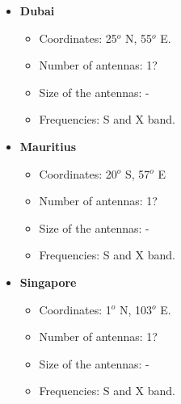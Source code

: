 \begin{itemize}
\begin{itemize}
\end{itemize}
\item \textbf{Dubai}
\begin{itemize}
\item Coordinates: 25$^{o}$ N, 55$^{o}$ E.
\item Number of antennas: 1?
\item Size of the antennas: -
\item Frequencies: S and X band.
\end{itemize}
\item \textbf{Mauritius}
\begin{itemize}
\item Coordinates: 20$^{o}$ S, 57$^{o}$ E
\item Number of antennas: 1?
\item Size of the antennas: -
\item Frequencies: S and X band.
\end{itemize}
\item \textbf{Singapore}
\begin{itemize}
\item Coordinates: 1$^{o}$ N, 103$^{o}$ E.
\item Number of antennas: 1?
\item Size of the antennas: -
\item Frequencies: S and X band.
\end{itemize}
\end{itemize}
